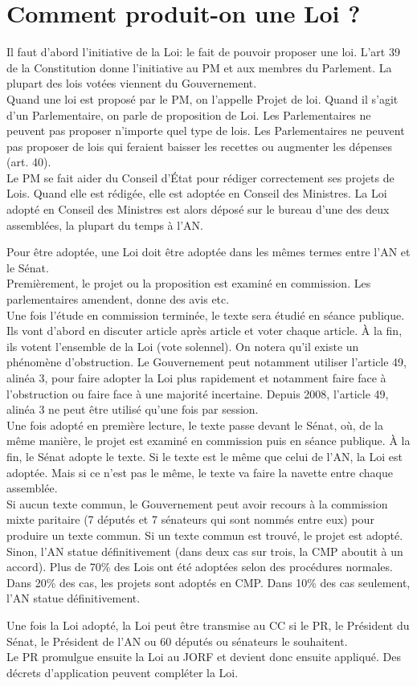 \documentclass[12pt, a4paper, openany]{book}
\begin{document}
\section{Comment produit-on une Loi ?}

Il faut d'abord l'initiative de la Loi: le fait de pouvoir proposer une loi. L'art 39 de la Constitution donne l'initiative au PM et aux membres du Parlement. La plupart des lois votées viennent du Gouvernement. \\
Quand une loi est proposé par le PM, on l'appelle Projet de loi. Quand il s'agit d'un Parlementaire, on parle de proposition de Loi. Les Parlementaires ne peuvent pas proposer n'importe quel type de lois. Les Parlementaires ne peuvent pas proposer de lois qui feraient baisser les recettes ou augmenter les dépenses (art. 40). \\
Le PM se fait aider du Conseil d'État pour rédiger correctement ses projets de Lois. Quand elle est rédigée, elle est adoptée en Conseil des Ministres. La Loi adopté en Conseil des Ministres est alors déposé sur le bureau d'une des deux assemblées, la plupart du temps à l'AN.


Pour être adoptée, une Loi doit être adoptée dans les mêmes termes entre l'AN et le Sénat. \\
Premièrement, le projet ou la proposition est examiné en commission. Les parlementaires amendent, donne des avis etc. \\
Une fois l'étude en commission terminée, le texte sera étudié en séance publique. Ils vont d'abord en discuter article après article et voter chaque article. À la fin, ils votent l'ensemble de la Loi (vote solennel). On notera qu'il existe un phénomène d'obstruction. Le Gouvernement peut notamment utiliser l'article 49, alinéa 3, pour faire adopter la Loi plus rapidement et notamment faire face à l'obstruction ou faire face à une majorité  incertaine. Depuis 2008, l'article 49, alinéa 3 ne peut être utilisé qu'une fois par session. \\
Une fois adopté en première lecture, le texte passe devant le Sénat, où, de la même manière, le projet est examiné en commission puis en séance publique. À la fin, le Sénat adopte le texte. Si le texte est le même que celui de l'AN, la Loi est adoptée. Mais si ce n'est pas le même, le texte va faire la navette entre chaque assemblée. \\
Si aucun texte commun, le Gouvernement peut avoir recours à la commission mixte paritaire (7 députés et 7 sénateurs qui sont nommés entre eux) pour produire un texte commun. Si un texte commun est trouvé, le projet est adopté. Sinon, l'AN statue définitivement (dans deux cas sur trois, la CMP aboutit à un accord). Plus de 70\% des Lois ont été adoptées selon des procédures normales. Dans 20\% des cas, les projets sont adoptés en CMP. Dans 10\% des cas seulement, l'AN statue définitivement. 


Une fois la Loi adopté, la Loi peut être transmise au CC si le PR, le Président du Sénat, le Président de l'AN ou 60 députés ou sénateurs le souhaitent. \\
Le PR promulgue ensuite la Loi au JORF et devient donc ensuite appliqué. Des décrets d'application peuvent compléter la Loi. 
\end{document}
